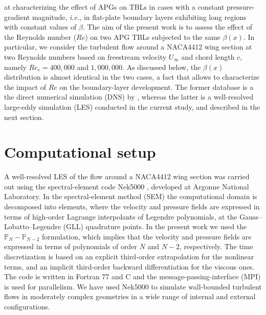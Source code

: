 at characterizing the effect of APGs on TBLs in cases with a constant pressure-gradient magnitude, {\it i.e.}, in flat-plate boundary layers exhibiting long regions with constant values of $\beta$.  The aim of the present work is to assess the effect of the Reynolds number ($Re$) on two APG TBLs subjected to the same $\beta(x)$. In particular, we consider the turbulent flow around a NACA4412 wing section at two Reynolds numbers based on freestream velocity $U_{\infty}$ and chord length $c$, namely $Re_{c}=400,000$ and $1,000,000$. As discussed below, the $\beta(x)$ distribution is almost identical in the two cases, a fact that allows to characterize the impact of $Re$ on the boundary-layer development. The former database is a the direct numerical simulation (DNS) by \cite{hosseini_et_al}, whereas the latter is a well-resolved large-eddy simulation (LES) conducted in the current study, and described in the next section.

\section{Computational setup}

A well-resolved LES of the flow around a NACA4412 wing section was carried out using the spectral-element code Nek5000 \citep{nek5000}, developed at Argonne National Laboratory. In the spectral-element method (SEM) the computational domain is decomposed into elements, where the velocity and pressure fields are expressed in terms of high-order Lagrange interpolants of Legendre polynomials, at the Gauss--Lobatto--Legendre (GLL) quadrature points. In the present work we used the $\mathbb{P}_{N}-\mathbb{P}_{N-2}$ formulation, which implies that the velocity and pressure fields are expressed in terms of polynomials of order $N$ and $N-2$, respectively. The time discretization is based on an explicit third-order extrapolation for the nonlinear terms, and an implicit third-order backward differentiation for the viscous ones. The code is written in Fortran 77 and C and the message-passing-interface (MPI) is used for parallelism. We have used Nek5000 to simulate wall-bounded turbulent flows in moderately complex geometries in a wide range of internal \citep{marin_et_al} and external \citep{skyscraper} configurations.

